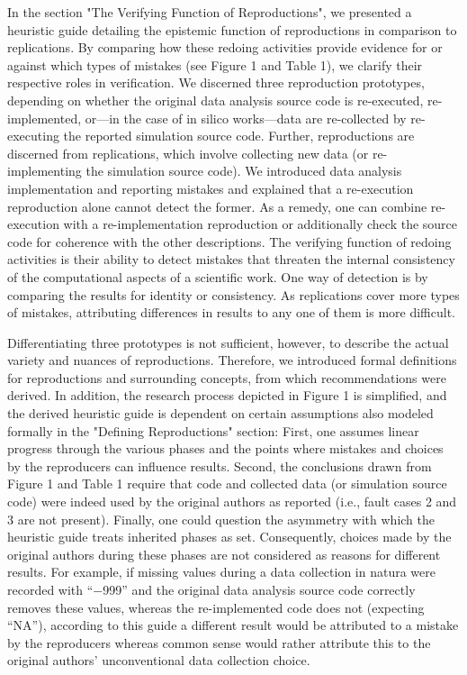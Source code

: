 \documentclass[authordate, meta]{jote-new-article}
\begin{document}
	In the section "The Verifying Function of Reproductions", we presented a heuristic guide detailing the epistemic function of reproductions in comparison to replications. By comparing how these redoing activities provide evidence for or against which types of mistakes (see Figure 1 and Table 1), we clarify their respective roles in verification. We discerned three reproduction prototypes, depending on whether the original data analysis source code is re-executed, re-implemented, or—in the case of in silico works—data are re-collected by re-executing the reported simulation source code. Further, reproductions are discerned from replications, which involve collecting new data (or re-implementing the simulation source code). We introduced data analysis implementation and reporting mistakes and explained that a re-execution reproduction alone cannot detect the former. As a remedy, one can combine re-execution with a re-implementation reproduction or additionally check the source code for coherence with the other descriptions. The verifying function of redoing activities is their ability to detect mistakes that threaten the internal consistency of the computational aspects of a scientific work. One way of detection is by comparing the results for identity or consistency. As replications cover more types of mistakes, attributing differences in results to any one of them is more difficult.


	Differentiating three prototypes is not sufficient, however, to describe the actual variety and nuances of reproductions. Therefore, we introduced formal definitions for reproductions and surrounding concepts, from which recommendations were derived. In addition, the research process depicted in Figure 1 is simplified, and the derived heuristic guide is dependent on certain assumptions also modeled formally in the "Defining Reproductions" section: First, one assumes linear progress through the various phases and the points where mistakes and choices by the reproducers can influence results. Second, the conclusions drawn from Figure 1 and Table 1 require that code and collected data (or simulation source code) were indeed used by the original authors as reported (i.e., fault cases 2 and 3 are not present). Finally, one could question the asymmetry with which the heuristic guide treats inherited phases as set. Consequently, choices made by the original authors during these phases are not considered as reasons for different results. For example, if missing values during a data collection in natura were recorded with “$-$999” and the original data analysis source code correctly removes these values, whereas the re-implemented code does not (expecting “NA”), according to this guide a different result would be attributed to a mistake by the reproducers whereas common sense would rather attribute this to the original authors' unconventional data collection choice.
\end{document}
